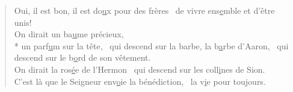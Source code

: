 
\begin{verse}
Oui, il est bon, il est do\underline{u}x pour des frères~\psalmstar
de vivre ens\underline{e}mble et d’être unis! \\

On dirait un ba\underline{u}me précieux, \\*
un parf\underline{u}m sur la tête,~\psalmdagger
qui descend sur la barbe, la b\underline{a}rbe d’Aaron,~\psalmstar
qui descend sur le b\underline{o}rd de son vêtement. \\

On dirait la ros\underline{é}e de l’Hermon~\psalmstar
qui descend sur les coll\underline{i}nes de Sion. \\
C’est là que le Seigneur env\underline{o}ie la bénédiction,~\psalmstar
la v\underline{i}e pour toujours. \\
\end{verse}

